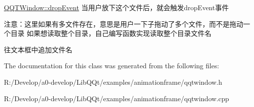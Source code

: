 \mbox{\hyperlink{class_q_q_t_window_af1c609c5ba8f3862442c3d1bced11fb4}{Q\+Q\+T\+Window\+::drop\+Event}} 当用户放下这个文件后，就会触发drop\+Event事件 

注意：这里如果有多文件存在，意思是用户一下子拖动了多个文件，而不是拖动一个目录 如果想读取整个目录，自己编写函数实现读取整个目录文件名

往文本框中追加文件名

The documentation for this class was generated from the following files\+:\begin{DoxyCompactItemize}
\item 
R\+:/\+Develop/a0-\/develop/\+Lib\+Q\+Qt/examples/animationframe/qqtwindow.\+h\item 
R\+:/\+Develop/a0-\/develop/\+Lib\+Q\+Qt/examples/animationframe/qqtwindow.\+cpp\end{DoxyCompactItemize}
